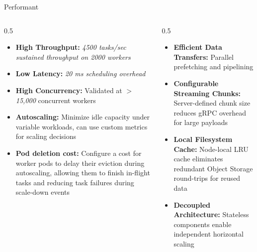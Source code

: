 \begin{frame}{Performant}
	\begin{columns}[T]
		\begin{column}{0.5\textwidth}
			\begin{itemize}
				\item \textbf{High Throughput:} \textit{4500 tasks/sec sustained throughput on 2000 workers}
				\item \textbf{Low Latency:} \textit{20 ms scheduling overhead}
				\item \textbf{High Concurrency:} Validated at $>$\textit{15,000} concurrent workers
				\item \textbf{Autoscaling:} Minimize idle capacity under variable workloads, can use custom metrics for scaling decisions
				\item \textbf{Pod deletion cost:} Configure a cost for worker pods to delay their eviction during autoscaling, allowing them to finish in-flight tasks and reducing task failures during scale-down events
			\end{itemize}
		\end{column}
		\begin{column}{0.5\textwidth}
			\begin{itemize}
				\item \textbf{Efficient Data Transfers:} Parallel prefetching and pipelining
				\item \textbf{Configurable Streaming Chunks:} Server-defined chunk size reduces gRPC overhead for large payloads
				\item \textbf{Local Filesystem Cache:} Node-local LRU cache eliminates redundant Object Storage round-trips for reused data
				\item \textbf{Decoupled Architecture:} Stateless components enable independent horizontal scaling
			\end{itemize}
		\end{column}
	\end{columns}
\end{frame}

